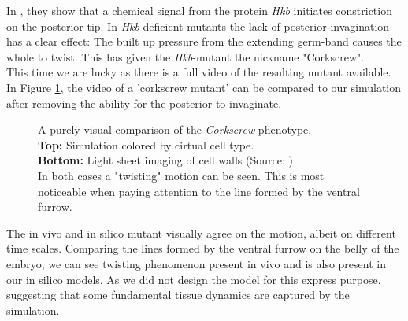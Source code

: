 In , they show that a chemical signal from the protein \textit{Hkb} initiates constriction on the posterior tip. In \textit{Hkb}-deficient mutants the lack of posterior invagination has a clear effect: The built up pressure from the extending germ-band causes the whole to twist. This has given the \textit{Hkb}-mutant the nickname "Corkscrew".\\

This time we are lucky as there is a full video of the resulting mutant available. In Figure \ref{fig:corkscrew-comparison}, the video of a 'corkscrew mutant' can be compared to our simulation after removing the ability for the posterior to invaginate.

 
\begin{figure}[H]
    \centering
    \caption{A purely visual comparison of the \textit{Corkscrew} phenotype.\\
    \textbf{Top:} Simulation colored by cirtual cell type. \\
    \textbf{Bottom:} Light sheet imaging of cell walls (Source: )\\ In both cases  a "twisting" motion can be seen. This is most noticeable when paying attention to the line formed by the ventral furrow.}
    \label{fig:corkscrew-comparison}
\end{figure}

The in vivo and in silico mutant visually agree on the motion, albeit on different time scales. Comparing the lines formed by the ventral furrow on the belly of the embryo, we can see twisting phenomenon present in vivo and is also present in our in silico models. As we did not design the model for this express purpose, suggesting that some fundamental tissue dynamics are captured by the simulation. \\


